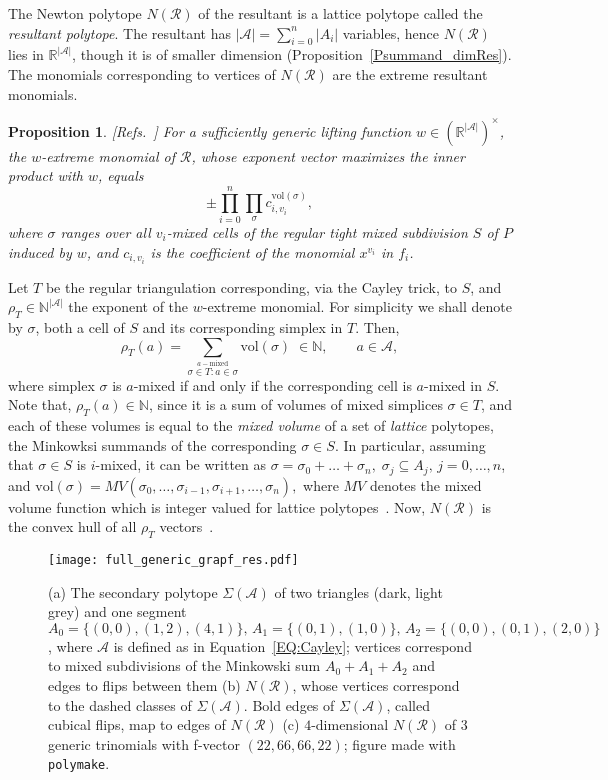 \documentclass{article}
\newtheorem{proposition}{Proposition}
\newcommand\refcite[1]{\citealp{#1}} \newcommand\citess[1]{\textsuperscript{\textup{\citealp{#1}}}}
\def\NN{{\mathbb N}} \def\QQ{{\mathbb Q}}
\def\RR{{\mathbb R}} \def\ZZ{{\mathbb Z}}
\def\A{{\mathcal A}} \def\R{{\mathcal R}}
\begin{document}
The Newton polytope $N(\R)$ of the resultant is a lattice polytope called the 
\textit{resultant polytope}. The resultant
has $|\A|=\sum_{i=0}^n |A_i|$ variables, hence $N(\R)$ lies in $\RR^{|\A|}$,
though it is of smaller dimension (Proposition~\ref{Psummand_dimRes}).
The monomials corresponding to vertices of $N(\R)$ are the
extreme resultant monomials.
\begin{proposition}{\rm [Refs.~\refcite{GKZ,St94}]} \label{PSturmf_extreme}
For a sufficiently generic lifting function $w\in (\RR^{|\A|})^{\times}$, 
the $w$-extreme monomial of $\R$, whose exponent vector 
maximizes the inner product with $w$, equals
\begin{equation}\label{Eq:Sturmf_extreme}
\pm \prod_{i=0}^{n} \prod_{\sigma} c_{i,v_{i}}^{\mathrm{vol}(\sigma)},
\end{equation}
where $\sigma$ ranges over all $v_i$-mixed cells of the regular tight mixed
subdivision $S$ of $P$ induced by $w$, and $c_{i,v_i}$ is the
coefficient of the monomial $x^{v_i}$ in $f_i$.
\end{proposition}
Let $T$ be the regular triangulation corresponding, via the Cayley trick,
to $S$, and $\rho_T\in\NN^{|\A|}$ the exponent of the $w$-extreme monomial.
For simplicity we shall denote by $\sigma$, both a cell of $S$  and its 
corresponding simplex in $T$. Then,
\begin{equation}\label{Eq:rho}
\rho_T(a)= \sum_{ \stackrel{a-\text{mixed}}{\sigma\in T : a\in \sigma}}
\mbox{vol}(\sigma)\; \in\NN, \qquad a\in\A ,
\end{equation}
where simplex $\sigma$ is $a$-mixed if and only if the corresponding cell 
is $a$-mixed in $S$. 
Note that, $\rho_T(a) \in \NN$, since it is
a sum of volumes of mixed simplices $\sigma\in T$, and each of these volumes is
equal to the \emph{mixed volume}\citess{CLO2} of a set of \emph{lattice}
polytopes, the Minkowksi summands of the corresponding $\sigma\in S$. In
particular, assuming that $\sigma \in S$ is $i$-mixed, it can be written as
$\sigma=\sigma_0+\dots+\sigma_n,\; \sigma_j \subseteq A_j,\, j=0,\ldots,n$, and
$
 \mbox{vol}(\sigma)=MV(\sigma_0,\ldots,\sigma_{i-1},\sigma_{i+1},\ldots,\sigma_n),
$
where $MV$ denotes the mixed volume function which is integer valued for 
lattice polytopes~\citess{CLO2}.
Now, $N(\R)$ is the convex hull of all $\rho_T$ vectors~\citess{GKZ,St94}.

\begin{figure*}[t] \centering
 \texttt{[image: full\_generic\_grapf\_res.pdf]}
 \caption{(a) 
The secondary polytope $\Sigma(\A)$ of two triangles (dark, light grey) and one
segment
$A_0=\{(0,0),(1,2),(4,1)\},\,A_1=\{(0,1),(1,0)\},\,A_2=\{(0,0),(0,1),(2,0)\}$,
where $\A$ is defined as in Equation~\ref{EQ:Cayley};
vertices correspond to mixed subdivisions of the
Minkowski sum $A_0+A_1+A_2$ and edges to flips between them
(b)
$N(\R)$, whose vertices correspond to the dashed classes of $\Sigma(\A)$.
Bold edges of $\Sigma(\A)$, called cubical flips, map to edges of $N(\R)$
(c)
$4$-dimensional $N(\R)$ of 3 generic trinomials with f-vector $(22,66,66,22)$;
figure made with {\tt polymake}.
}
\label{fig:sec_res} \end{figure*}
\end{document}
